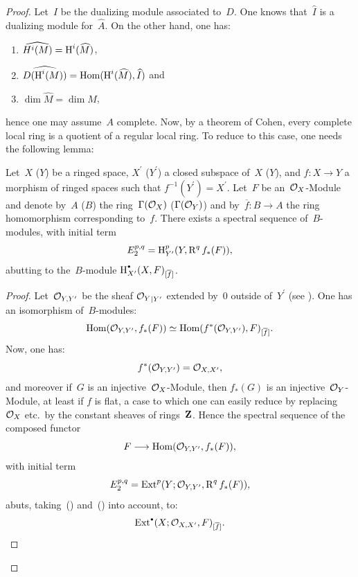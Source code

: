 \begin{proof}
Let~$I$ be the dualizing module associated to~$D$. One knows that~$\widehat{I}$ is a dualizing module for~$\widehat{A}$. On the other hand, one has:
\begin{enumerate}
\item[] $\widehat{H^i(M)}=\operatorname{H}^{i}(\widehat{M})$,
\item[] $\widehat{D(\operatorname{H}^{i}(M))}=\operatorname{Hom}(\operatorname{H}^{i}(\widehat{M}), \widehat{I})$ and
\item[] $\dim\widehat{M}=\dim M$,
\end{enumerate}
\noindent
hence one may assume~$A$ complete. Now, by a theorem of Cohen, every complete local ring is a quotient of a regular local ring. To reduce to this case, one needs the following lemma:

\begin{lemma} \label{V.3.2}
Let~$X$ (\resp $Y$) be a ringed space, $X^{\prime}$ (\resp $Y^{\prime}$) a closed subspace of~$X$ (\resp $Y$), and $f\colon X\to Y$ a morphism of ringed spaces such that $f^{-1}(Y^{\prime})=X^{\prime}$. Let~$F$ be an~$\mathcal{O}_X$-Module and denote by~$A$ (\resp $B$) the ring~$\Gamma(\mathcal{O}_X)$ (\resp $\Gamma({\mathcal O}_{Y})$) and by~$\overline{f}\colon B\to A$ the ring homomorphism corresponding to~$f$. There exists a spectral sequence of~$B$-modules, with initial term
\begin{equation} \label{eq:V.15} E_{2}^{p, q}=\operatorname{H}_{Y^{\prime}}^{p}(Y, \operatorname{R}^{q}f_{\ast}(F)),
\end{equation}
abutting to the~$B$-module $\H_{X^{\prime}}^{\boule}(X, F)_{[\overline{f}]}$.
\end{lemma}

\begin{proof}
Let~${\mathcal O}_{Y, Y^{\prime}}$ be the sheaf ${{\mathcal O}_{Y}}_{|Y^{\prime}}$ extended by~$0$ outside of~$Y^{\prime}$ (see \Exp {}). One has an isomorphism of~$B$-modules:
\begin{equation} \label{eq:V.16} \operatorname{Hom}({\mathcal O}_{Y, Y^{\prime}}, f_{\ast}(F))\simeq\operatorname{Hom}(f^{\ast}({\mathcal O}_{Y, Y^{\prime}}), F)_{[\overline{f}]}.
\end{equation}
Now, one has:
\begin{equation} \label{eq:V.17} f^{\ast}({\mathcal O}_{Y, Y^{\prime}})={\mathcal O}_{X, X^{\prime}},
\end{equation}
and moreover if~$G$ is an injective~$\mathcal{O}_X$-Module, then
$f_{\ast}(G)$ is an injective~${\mathcal O}_{Y}$-Module, at least if $f$
is flat, a case to which one can easily reduce by replacing
$\mathcal{O}_X$ etc.\ by the constant sheaves of rings~$\mathbf{Z}$. Hence the
spectral sequence of the composed functor
\[
F\to\Hom(\Oo_{Y, Y^{\prime}}, f_{\ast}(F)),
\]
with initial term
\[
E_{2}^{p, q}=\operatorname{Ext}^{p}(Y;{\mathcal O}_{Y, Y^{\prime}}, \operatorname{R}^{q}f_{\ast}(F)),
\]
abuts, taking~() and~() into account, to:
\[
\Ext^{\boule}(X;\Oo_{X, X^{\prime}}, F)_{[\overline{f}]}.
\]


\end{proof}
\end{proof}
